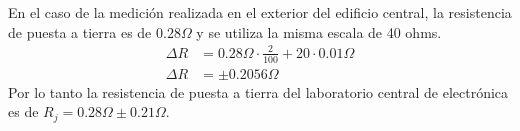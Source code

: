 En el caso de la medición realizada en el exterior del edificio central, la resistencia de puesta a tierra es de $0.28\Omega$ y se utiliza la misma escala de 40 ohms.
\begin{equation*}
\begin{split}
    \Delta R &= 0.28\Omega \cdot \frac{2}{100} + 20 \cdot 0.01\Omega \\
    \Delta R &= \pm0.2056\Omega
\end{split}
\end{equation*}
Por lo tanto la resistencia de puesta a tierra del laboratorio central de electrónica es de $R_j = 0.28\Omega \pm 0.21\Omega$.